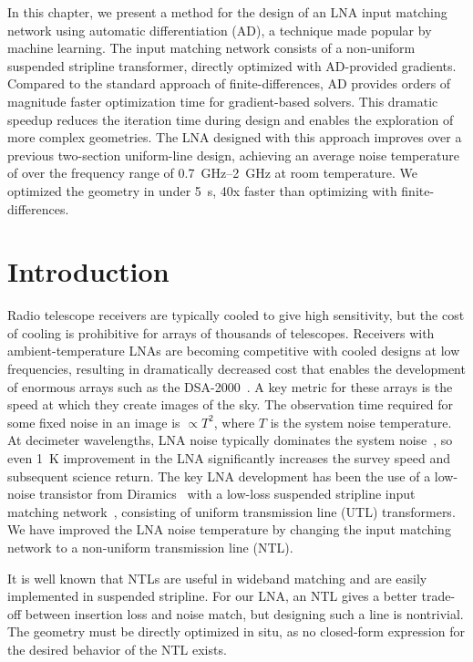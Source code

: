 In this chapter, we present a method for the design of an LNA input matching network using automatic differentiation (AD), a technique made popular by machine learning.
The input matching network consists of a non-uniform suspended stripline transformer, directly optimized with AD-provided gradients.
Compared to the standard approach of finite-differences, AD provides orders of magnitude faster optimization time for gradient-based solvers.
This dramatic speedup reduces the iteration time during design and enables the exploration of more complex geometries.
The LNA designed with this approach improves over a previous two-section uniform-line design, achieving an average noise temperature of \newnoise over the frequency range of \qtyrange{0.7}{2}{\GHz} at room temperature.
We optimized the geometry in under \qty{5}{\s}, \num{40}x faster than optimizing with finite-differences.

\section{Introduction}

Radio telescope receivers are typically cooled to give high sensitivity, but the cost of cooling is prohibitive for arrays of thousands of telescopes.
Receivers with ambient-temperature LNAs are becoming competitive with cooled designs at low frequencies, resulting in dramatically decreased cost that enables the development of enormous arrays such as the DSA-2000~\cite{hallinanDSA2000RadioSurvey2019}.
A key metric for these arrays is the speed at which they create images of the sky.
The observation time required for some fixed noise in an image is $\propto T^2$, where $T$ is the system noise temperature.
At decimeter wavelengths, LNA noise typically dominates the system noise~\cite{flygareWidebandLowLossFeed2024}, so even \qty{1}{\K} improvement in the LNA significantly increases the survey speed and subsequent science return.
The key LNA development has been the use of a low-noise transistor from Diramics~\cite{DiramicsPH2004F50} with a low-loss suspended stripline input matching network~\cite{weinrebLowNoiseAmplifier2021, shiRoomTemperatureLowNoiseAmplifier2023}, consisting of uniform transmission line (UTL) transformers.
We have improved the LNA noise temperature by changing the input matching network to a non-uniform transmission line (NTL).

It is well known that NTLs are useful in wideband matching and are easily implemented in suspended stripline.
For our LNA, an NTL gives a better trade-off between insertion loss and noise match, but designing such a line is nontrivial.
The geometry must be directly optimized in situ, as no closed-form expression for the desired behavior of the NTL exists.

